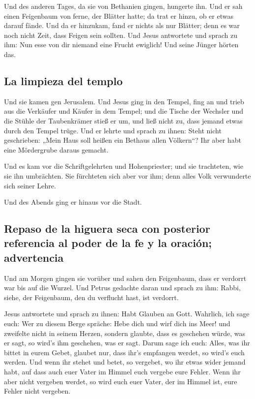  Und des anderen Tages, da sie von Bethanien gingen,
hungerte ihn.  Und er sah einen Feigenbaum von ferne, der
Blätter hatte; da trat er hinzu, ob er etwas darauf fände. Und da er
hinzukam, fand er nichts als nur Blätter; denn es war noch nicht Zeit,
dass Feigen sein sollten.  Und Jesus antwortete und
sprach zu ihm: Nun esse von dir niemand eine Frucht ewiglich! Und seine
Jünger hörten das.

\hypertarget{la-limpieza-del-templo}{%
\subsection{La limpieza del templo}\label{la-limpieza-del-templo}}

 Und sie kamen gen Jerusalem. Und Jesus ging in den
Tempel, fing an und trieb aus die Verkäufer und Käufer in dem Tempel;
und die Tische der Wechsler und die Stühle der Taubenkrämer stieß er um,
 und ließ nicht zu, dass jemand etwas durch den Tempel
trüge.  Und er lehrte und sprach zu ihnen: Steht nicht
geschrieben: „Mein Haus soll heißen ein Bethaus allen Völkern``? Ihr
aber habt eine Mördergrube daraus gemacht.

 Und es kam vor die Schriftgelehrten und Hohenpriester;
und sie trachteten, wie sie ihn umbrächten. Sie fürchteten sich aber vor
ihm; denn alles Volk verwunderte sich seiner Lehre.

 Und des Abends ging er hinaus vor die Stadt.

\hypertarget{repaso-de-la-higuera-seca-con-posterior-referencia-al-poder-de-la-fe-y-la-oraciuxf3n-advertencia}{%
\subsection{Repaso de la higuera seca con posterior referencia al poder
de la fe y la oración;
advertencia}\label{repaso-de-la-higuera-seca-con-posterior-referencia-al-poder-de-la-fe-y-la-oraciuxf3n-advertencia}}

 Und am Morgen gingen sie vorüber und sahen den
Feigenbaum, dass er verdorrt war bis auf die Wurzel.  Und
Petrus gedachte daran und sprach zu ihm: Rabbi, siehe, der Feigenbaum,
den du verflucht hast, ist verdorrt.

 Jesus antwortete und sprach zu ihnen: Habt Glauben an
Gott.  Wahrlich, ich sage euch: Wer zu diesem Berge
spräche: Hebe dich und wirf dich ins Meer! und zweifelte nicht in seinem
Herzen, sondern glaubte, dass es geschehen würde, was er sagt, so wird's
ihm geschehen, was er sagt.  Darum sage ich euch: Alles,
was ihr bittet in eurem Gebet, glaubet nur, dass ihr's empfangen werdet,
so wird's euch werden.  Und wenn ihr stehet und betet, so
vergebet, wo ihr etwas wider jemand habt, auf dass auch euer Vater im
Himmel euch vergebe eure Fehler.  Wenn ihr aber nicht
vergeben werdet, so wird euch euer Vater, der im Himmel ist, eure Fehler
nicht vergeben.

